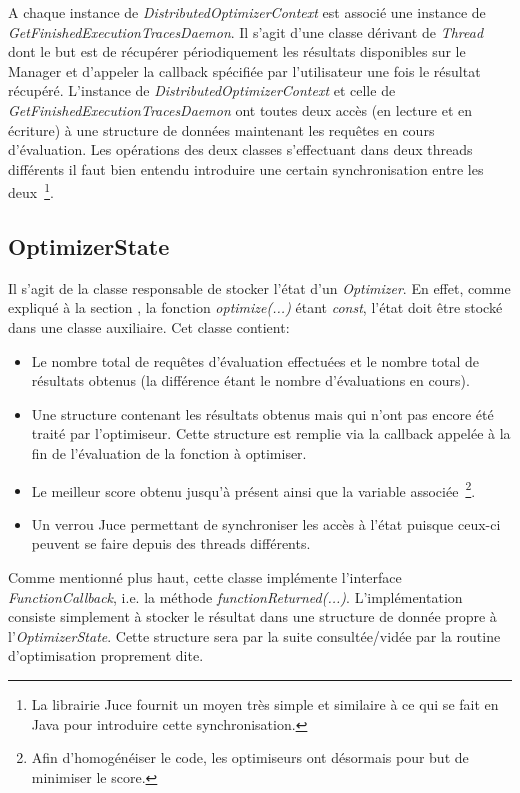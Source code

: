 \documentclass[a4paper, 11pt]{article}
\begin{document}
A chaque instance de \textit{DistributedOptimizerContext} est associé une instance de \textit{GetFinishedExecutionTracesDaemon}. Il s'agit d'une classe dérivant de \textit{Thread} dont le but est de récupérer périodiquement les résultats disponibles sur le Manager et d'appeler la callback spécifiée par l'utilisateur une fois le résultat récupéré. L'instance de \textit{DistributedOptimizerContext} et celle de \textit{GetFinishedExecutionTracesDaemon} ont toutes deux accès (en lecture et en écriture) à une structure de données maintenant les requêtes en cours d'évaluation. Les opérations des deux classes s'effectuant dans deux threads différents il faut bien entendu introduire une certain synchronisation entre les deux~\footnote{La librairie Juce fournit un moyen très simple et similaire à ce qui se fait en Java pour introduire cette synchronisation.}.


\subsection{OptimizerState}
Il s'agit de la classe responsable de stocker l'état d'un \textit{Optimizer}. En effet, comme expliqué à la section %
, la fonction \textit{optimize(...)} étant \textit{const}, l'état doit être stocké dans une classe auxiliaire. Cet classe contient:
\begin{itemize}
\item Le nombre total de requêtes d'évaluation effectuées et le nombre total de résultats obtenus (la différence étant le nombre d'évaluations en cours).
\item Une structure contenant les résultats obtenus mais qui n'ont pas encore été traité par l'optimiseur. Cette structure est remplie via la callback appelée à la fin de l'évaluation de la fonction à optimiser.
\item Le meilleur score obtenu jusqu'à présent ainsi que la variable associée~\footnote{Afin d'homogénéiser le code, les optimiseurs ont désormais pour but de minimiser le score.}.
\item Un verrou Juce permettant de synchroniser les accès à l'état puisque ceux-ci peuvent se faire depuis des threads différents.
\end{itemize}

Comme mentionné plus haut, cette classe implémente l'interface \textit{FunctionCallback}, i.e. la méthode \textit{functionReturned(...)}. L'implémentation consiste simplement à stocker le résultat dans une structure de donnée propre à l'\textit{OptimizerState}. Cette structure sera par la suite consultée/vidée par la routine d'optimisation proprement dite.
\end{document}
